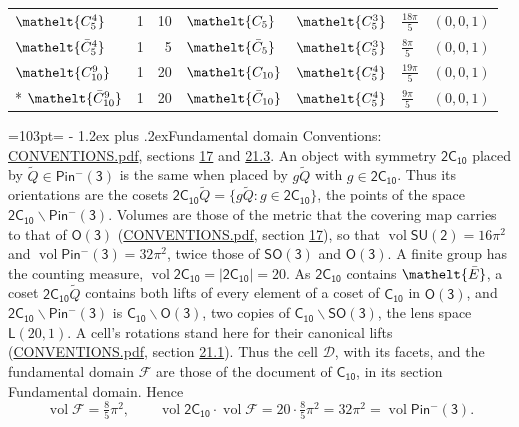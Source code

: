 \documentclass[10pt,a4paper]{article}
\makeatletter
\renewcommand\section{\@startsection{section}{1}{\z@}{-3ex plus -1ex minus -.2ex}%
  {1.2ex plus .2ex}{\normalfont\large\sffamily\bfseries\color{parttitle}}}
\newcommand{\needspace}[1]{\par\penalty-100\begingroup\dimen0=#1\relax\dimen2=\pagegoal
  \advance\dimen2-\pagetotal\ifdim\dimen0>\dimen2\relax\ifdim\dimen2>0pt\vfil\break\fi\fi
  \endgroup}
\numberwithin{equation}{section}
\newcommand{\eltfont}[1]{{\let\sigma\eltsigma\mathelt{#1}}}
\newcommand{\grp}[1]{\mathsf{#1}}
\newcommand{\cls}[1]{\eltfont{#1}}
\newcommand{\elt}[1]{\eltfont{#1}}
\newcommand{\dirvec}[3]{(#1, #2, #3)}
\newcommand{\vol}{\operatorname{vol}}
\newcommand{\fcell}{\mathcal{D}}
\newcommand{\fdomain}{\mathcal{F}}
\newcommand{\lensspace}[2]{\mathsf{L}(#1, #2)}
\newcommand{\barred}[1]{\bar{#1}}
\newcommand{\lift}[1]{\tilde{#1}}
\makeatother
\begin{document}
{\begin{longtable}{@{}lrrllll@{}}
$\cls{C_{5}^{4}}$ & 1 & 10 & $\cls{C_{5}}$ & $\cls{C_{5}^{3}}$ & $\tfrac{18\pi}{5}$ & $\dirvec{0}{0}{1}$\\
$\cls{\barred{C}_{5}^{4}}$ & 1 & 5 & $\cls{\barred{C}_{5}}$ & $\cls{C_{5}^{3}}$ & $\tfrac{8\pi}{5}$ & $\dirvec{0}{0}{1}$\\
$\cls{C_{10}^{9}}$ & 1 & 20 & $\cls{C_{10}}$ & $\cls{C_{5}^{4}}$ & $\tfrac{19\pi}{5}$ & $\dirvec{0}{0}{1}$\\*
$\cls{\barred{C}_{10}^{9}}$ & 1 & 20 & $\cls{\barred{C}_{10}}$ & $\cls{C_{5}^{4}}$ & $\tfrac{9\pi}{5}$ & $\dirvec{0}{0}{1}$\\
\bottomrule\end{longtable}}
\needspace{103pt}
\section{Fundamental domain}\label{s:fundamental_domain}
Conventions: \href{../../CONVENTIONS.pdf}{CONVENTIONS.pdf}, sections \href{../../../rotation/CONVENTIONS.pdf\#conv.17}{17} and \href{../../CONVENTIONS.pdf\#conv.21.3}{21.3}.
An object with symmetry $\grp{2C_{10}}$ placed by $\lift{Q} \in \grp{Pin^{-}(3)}$ is the same when placed by $g\lift{Q}$ with $g \in \grp{2C_{10}}$. \label{n:operator.cosets}Thus its orientations are the cosets $\grp{2C_{10}}\lift{Q} = \{g\lift{Q} : g \in \grp{2C_{10}}\}$, the points of the space $\grp{2C_{10}}\backslash\grp{Pin^{-}(3)}$. \label{n:operator.volume}Volumes are those of the metric that the covering map carries to that of \href{../../../rotation/data/pdf/O3.pdf}{$\grp{O(3)}$} (\href{../../CONVENTIONS.pdf}{CONVENTIONS.pdf}, section \href{../../../rotation/CONVENTIONS.pdf\#conv.17}{17}), so that $\vol\grp{SU(2)} = 16\pi^2$ and $\vol\grp{Pin^{-}(3)} = 32\pi^2$, twice those of $\grp{SO(3)}$ and $\grp{O(3)}$. A finite group has the counting measure, $\vol\grp{2C_{10}} = |\grp{2C_{10}}| = 20$.
\leavevmode\label{n:set.lens}As $\grp{2C_{10}}$ contains $\elt{\barred{E}}$, a coset $\grp{2C_{10}}\lift{Q}$ contains both lifts of every element of a coset of \href{../../../rotation/data/pdf/C10.pdf}{$\grp{C_{10}}$} in $\grp{O(3)}$, and $\grp{2C_{10}}\backslash\grp{Pin^{-}(3)}$ is $\grp{C_{10}}\backslash\grp{O(3)}$, two copies of $\grp{C_{10}}\backslash\grp{SO(3)}$, the lens space $\lensspace{20}{1}$. A cell's rotations stand here for their canonical lifts (\href{../../CONVENTIONS.pdf}{CONVENTIONS.pdf}, section \href{../../CONVENTIONS.pdf\#conv.21.1}{21.1}). \label{n:set.cell}\label{n:set.fundamental}Thus the cell $\fcell$, with its facets, and the fundamental domain $\fdomain$ are those of the document of \href{../../../rotation/data/pdf/C10.pdf}{$\grp{C_{10}}$}, in its section Fundamental domain. Hence
\begin{equation}\label{e:volume}\vol\fdomain = \tfrac{8}{5}\pi^2,\qquad \vol\grp{2C_{10}}\cdot\vol\fdomain = 20\cdot \tfrac{8}{5}\pi^2 = 32\pi^2 = \vol\grp{Pin^{-}(3)}.\end{equation}
\end{document}
